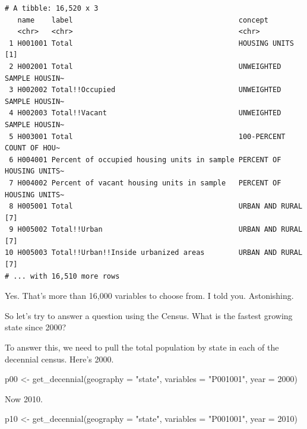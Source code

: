\documentclass[
  letterpaper,
  DIV=11,
  numbers=noendperiod]{scrreprt}
\newenvironment{Shaded}{\begin{snugshade}}{\end{snugshade}}
\newcommand{\AttributeTok}[1]{\textcolor[rgb]{0.40,0.45,0.13}{#1}}
\newcommand{\DecValTok}[1]{\textcolor[rgb]{0.68,0.00,0.00}{#1}}
\newcommand{\FunctionTok}[1]{\textcolor[rgb]{0.28,0.35,0.67}{#1}}
\newcommand{\NormalTok}[1]{\textcolor[rgb]{0.00,0.23,0.31}{#1}}
\newcommand{\OtherTok}[1]{\textcolor[rgb]{0.00,0.23,0.31}{#1}}
\newcommand{\StringTok}[1]{\textcolor[rgb]{0.13,0.47,0.30}{#1}}
\begin{document}
\begin{verbatim}
# A tibble: 16,520 x 3
   name    label                                       concept                  
   <chr>   <chr>                                       <chr>                    
 1 H001001 Total                                       HOUSING UNITS [1]        
 2 H002001 Total                                       UNWEIGHTED SAMPLE HOUSIN~
 3 H002002 Total!!Occupied                             UNWEIGHTED SAMPLE HOUSIN~
 4 H002003 Total!!Vacant                               UNWEIGHTED SAMPLE HOUSIN~
 5 H003001 Total                                       100-PERCENT COUNT OF HOU~
 6 H004001 Percent of occupied housing units in sample PERCENT OF HOUSING UNITS~
 7 H004002 Percent of vacant housing units in sample   PERCENT OF HOUSING UNITS~
 8 H005001 Total                                       URBAN AND RURAL [7]      
 9 H005002 Total!!Urban                                URBAN AND RURAL [7]      
10 H005003 Total!!Urban!!Inside urbanized areas        URBAN AND RURAL [7]      
# ... with 16,510 more rows
\end{verbatim}

Yes. That's more than 16,000 variables to choose from. I told you.
Astonishing.

So let's try to answer a question using the Census. What is the fastest
growing state since 2000?

To answer this, we need to pull the total population by state in each of
the decennial census. Here's 2000.

\begin{Shaded}
\begin{Highlighting}[]
\NormalTok{p00 }\OtherTok{\textless{}{-}} \FunctionTok{get\_decennial}\NormalTok{(}\AttributeTok{geography =} \StringTok{"state"}\NormalTok{, }\AttributeTok{variables =} \StringTok{"P001001"}\NormalTok{, }\AttributeTok{year =} \DecValTok{2000}\NormalTok{)}
\end{Highlighting}
\end{Shaded}

Now 2010.

\begin{Shaded}
\begin{Highlighting}[]
\NormalTok{p10 }\OtherTok{\textless{}{-}} \FunctionTok{get\_decennial}\NormalTok{(}\AttributeTok{geography =} \StringTok{"state"}\NormalTok{, }\AttributeTok{variables =} \StringTok{"P001001"}\NormalTok{, }\AttributeTok{year =} \DecValTok{2010}\NormalTok{)}
\end{Highlighting}
\end{Shaded}
\end{document}
